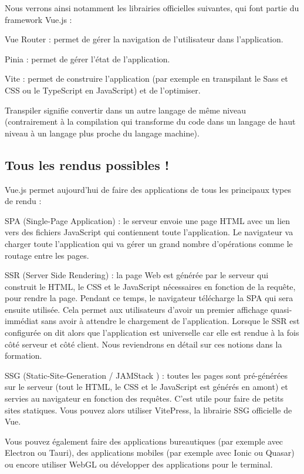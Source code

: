 \documentclass{article}
\begin{document}
Nous verrons ainsi notamment les librairies officielles suivantes, qui font partie du framework Vue.js :

Vue Router : permet de gérer la navigation de l'utilisateur dans l'application.

Pinia : permet de gérer l'état de l'application.

Vite : permet de construire l'application (par exemple en transpilant le Sass et CSS ou le TypeScript en JavaScript) et de l'optimiser.

Transpiler signifie convertir dans un autre langage de même niveau (contrairement à la compilation qui transforme du code dans un langage de haut niveau à un langage plus proche du langage machine).

\subsection{Tous les rendus possibles !}
Vue.js permet aujourd'hui de faire des applications de tous les principaux types de rendu :

SPA (Single-Page Application) : le serveur envoie une page HTML avec un lien vers des fichiers JavaScript qui contiennent toute l'application. Le navigateur va charger toute l'application qui va gérer un grand nombre d'opérations comme le routage entre les pages.

SSR (Server Side Rendering) : la page Web est générée par le serveur qui construit le HTML, le CSS et le JavaScript nécessaires en fonction de la requête, pour rendre la page. Pendant ce temps, le navigateur télécharge la SPA qui sera ensuite utilisée. Cela permet aux utilisateurs d'avoir un premier affichage quasi-immédiat sans avoir à attendre le chargement de l'application. Lorsque le SSR est configurée on dit alors que l'application est universelle car elle est rendue à la fois côté serveur et côté client. Nous reviendrons en détail sur ces notions dans la formation.

SSG (Static-Site-Generation / JAMStack ) : toutes les pages sont pré-générées sur le serveur (tout le HTML, le CSS et le JavaScript est générés en amont) et servies au navigateur en fonction des requêtes. C'est utile pour faire de petits sites statiques. Vous pouvez alors utiliser VitePress, la librairie SSG officielle de Vue.

Vous pouvez également faire des applications bureautiques (par exemple avec Electron ou Tauri), des applications mobiles (par exemple avec Ionic ou Quasar) ou encore utiliser WebGL ou développer des applications pour le terminal.
\end{document}
